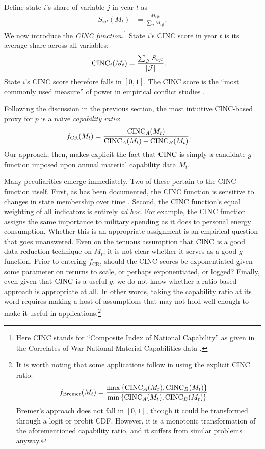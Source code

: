 Define state $i$'s share of variable $j$ in year $t$ as
\begin{align*}
  S_{ijt}(M_{t}) &= \frac{M_{ijt}}{\sum_{\mathcal{I}} M_{ijt}}.
\end{align*}
We now introduce the \emph{CINC function}.\footnote{Here CINC stands for ``Composite Index of National Capability'' as given in the Correlates of War National Material Capabilities data \citep{singer1972}.} 
State $i$'s CINC score in year $t$ is its average share across all variables:
\begin{align*}
  \operatorname{CINC}_i(M_t) &= \frac{\sum_{\mathcal{J}} S_{ijt}}{\left|\mathcal{J}\right|}.
\end{align*}
State $i$'s CINC score therefore falls in $[0,1]$. 
The CINC score is the ``most commonly used measure'' of power in empirical conflict studies \citep[212]{kadera2004}.

Following the discussion in the previous section, the most intuitive CINC-based proxy for $p$ is a na\"{\i}ve \emph{capability ratio}:
\begin{align*}
  f_{\text{CR}}(M_t) &= \frac{\operatorname{CINC}_A(M_t)}{\operatorname{CINC}_A(M_t) + \operatorname{CINC}_B(M_t)}.
\end{align*}
Our approach, then, makes explicit the fact that $\operatorname{CINC}$ is simply a candidate $g$ function imposed upon annual material capability data $M_t$.

Many peculiarities emerge immediately. 
Two of these pertain to the CINC function itself. 
First, as has been documented, the CINC function is sensitive to changes in state membership over time \citep{organski1980,gleditsch1999,kadera2004}. 
Second, the CINC function's equal weighting of all indicators is entirely \emph{ad hoc}. 
For example, the CINC function assigns the same importance to military spending as it does to personal energy consumption. 
Whether this is an appropriate assignment is an empirical question that goes unanswered. 
Even on the tenuous assumption that $\operatorname{CINC}$ is a good data reduction technique on $M_t$, it is not clear whether it serves as a good $g$ function. 
Prior to entering $f_{\text{CR}}$, should the CINC scores be exponentiated given some parameter on returns to scale, or perhaps exponentiated, or logged? 
Finally, even given that $\operatorname{CINC}$ is a useful $g$, we do not know whether a ratio-based approach is appropriate at all. 
In other words, taking the capability ratio at its word requires making a host of assumptions that may not hold well enough to make it useful in applications.\footnote{
  It is worth noting that some applications follow \citet{bremer1992} in using the explicit CINC ratio:
  \begin{align*}
    f_{\text{Bremer}}(M_t) &= \frac{\max\left\{\operatorname{CINC}_A(M_t),\operatorname{CINC}_B(M_t)\right\}}{\min\left\{\operatorname{CINC}_A(M_t),\operatorname{CINC}_B(M_t)\right\}}.
  \end{align*}
  Bremer's approach does not fall in $[0,1]$, though it could be transformed through a logit or probit CDF. 
  However, it is a monotonic transformation of the aforementioned capability ratio, and it suffers from similar problems anyway.
}

